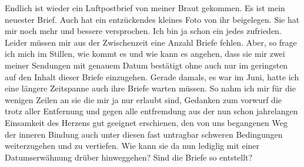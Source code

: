 \def\day{7. Oktober 1942 *}
\mktitle

Endlich ist wieder ein Luftpostbrief von meiner Braut gekommen.
Es ist mein neuester Brief.
Auch hat ein entz\"{u}ckendes kleines Foto von ihr beigelegen.
Sie hat mir noch mehr und bessere versprochen.
Ich bin ja schon ein jedes zufrieden.
Leider m\"{u}ssen mir aus der Zwischenzeit eine Anzahl Briefe fehlen.
Aber, so frage ich mich im Stillen, wie kommt es und wie kann es angehen, dass sie mir zwei meiner Sendungen mit genauem Datum best\"{a}tigt ohne auch nur im geringsten auf den Inhalt dieser Briefe einzugehen.
Gerade damals, es war im Juni, hatte ich eine l\"{a}ngere Zeitspanne auch ihre Briefe warten m\"{u}ssen.
So nahm ich mir f\"{u}r die wenigen Zeilen an sie die mir ja nur erlaubt sind, Gedanken zum vorwurf die trotz aller Entfernung und gegen alle entfremdung aus der nun schon jahrelangen Einsamkeit des Herzens gut geeignet erschienen, den von uns begangenen Weg der inneren Bindung auch unter diesen fast untragbar schweren Bedingungen weiterzugehen und zu vertiefen.
Wie kann sie da nun lediglig mit einer Datumserw\"{a}hnung dr\"{u}ber hinweggehen?
Sind die Briefe so entstellt?

\clearpage
